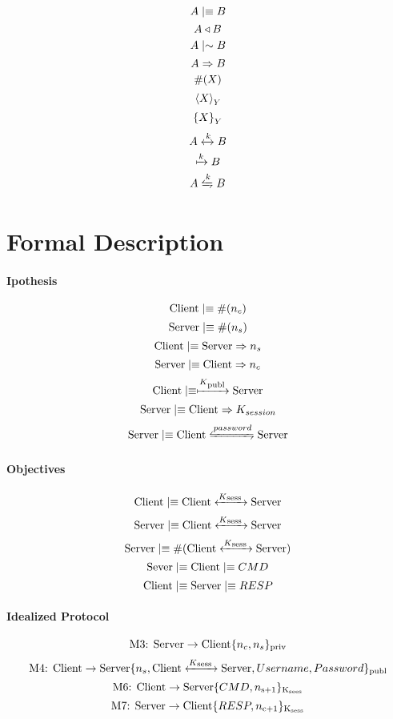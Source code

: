 \[A \mid\equiv B \]
\[A \triangleleft B \]
\[A \mid\sim B \]
\[A \Rightarrow B \]
\[\#(X)\]
\[{\langle X \rangle}_{Y}\]
\[{ \{ X \} }_{Y}\]
\[A \xleftrightarrow{k} B \]
\[\xmapsto{k} B\]
\[A \secret{k} B\]

\section{Formal Description}
\paragraph{Ipothesis}
\[\textnormal{Client} \mid\equiv \#(n_c)\]
\[\textnormal{Server} \mid\equiv \#(n_s)\]
\[\textnormal{Client} \mid\equiv \textnormal{Server} \Rightarrow n_s\]
\[\textnormal{Server} \mid\equiv \textnormal{Client} \Rightarrow n_c\]
\[\textnormal{Client} \mid\equiv \xmapsto{K\textsubscript{publ}} \textnormal{Server}\]
\[\textnormal{Server} \mid\equiv \textnormal{Client} \Rightarrow K_{session}\]
\[\textnormal{Server} \believes \textnormal{Client} \secret{password} \textnormal{Server}\]

\paragraph{Objectives}
\[\textnormal{Client} \mid\equiv \textnormal{Client} \xleftrightarrow{K\textsubscript{sess }} \textnormal{Server}\]
\[\textnormal{Server} \mid\equiv \textnormal{Client} \xleftrightarrow{K\textsubscript{sess }} \textnormal{Server}\]
\[\textnormal{Server} \mid\equiv \#(\textnormal{Client} \xleftrightarrow{K\textsubscript{sess }} \textnormal{Server})\]
\[\textnormal{Sever} \mid\equiv \textnormal{Client}\mid\equiv CMD\]
\[\textnormal{Client} \mid\equiv \textnormal{Server}\mid\equiv RESP\]

\paragraph{Idealized Protocol}
\[\textnormal{M3: Server} \rightarrow \textnormal{Client} \lbrace n_c,n_s \rbrace \textsubscript{priv} \]
\[\textnormal{M4: Client} \rightarrow \textnormal{Server} \lbrace n_s,\textnormal{Client} \xleftrightarrow{K\textsubscript{sess }} \textnormal{Server} ,Username,Password \rbrace \textsubscript{publ}\]
\[\textnormal{M6: Client} \rightarrow \textnormal{Server} \lbrace CMD,n\textsubscript{s+1} \rbrace \textsubscript{K\textsubscript{sees}}\]
\[\textnormal{M7: Server} \rightarrow \textnormal{Client} \lbrace RESP,n\textsubscript{c+1} \rbrace \textsubscript{K\textsubscript{sess}}\]

